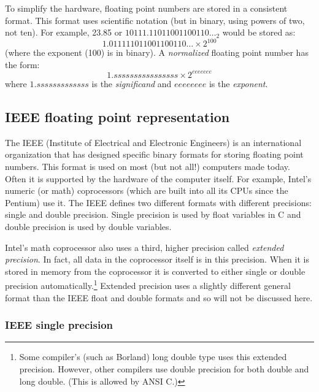 To simplify the hardware, floating point numbers are stored in a consistent
format. This format uses scientific notation (but in binary, using powers of
two, not ten). For example, 23.85 or $10111.11011001100110\ldots_2$ would be
stored as:
\[ 1.011111011001100110\ldots \times 2^{100} \]
(where the exponent (100) is in binary). A \emph{normalized} floating point
number has the form:
\[ 1.ssssssssssssssss \times 2^{eeeeeee} \]
where $1.sssssssssssss$ is the \emph{significand} and $eeeeeeee$ is the
\emph{exponent}.

\subsection{IEEE floating point representation}

The IEEE (Institute of Electrical and Electronic Engineers) is an
international organization that has designed specific binary formats
for storing floating point num\-bers. This format is used on most (but
not all!)  computers made today. Often it is supported by the hardware
of the computer itself. For example, Intel's numeric (or math)
coprocessors (which are built into all its CPUs since the Pentium)
use it. The IEEE defines two different formats with different
precisions: single and double precision. Single precision is used by
{\code float} variables in C and double precision is used by {\code
double} variables.

Intel's math coprocessor also uses a third, higher precision called
\emph{extended precision}. In fact, all data in the coprocessor itself is
in this precision. When it is stored in memory from the coprocessor it
is converted to either single or double precision automatically.\footnote{
Some compiler's (such as Borland) {\code long double} type uses this
extended precision. However, other compilers use double precision for
both {\code double} and {\code long double}. (This is allowed by ANSI C.)}
Extended precision uses a slightly different general format than the
IEEE float and double formats and so will not be discussed here.

\subsubsection{IEEE single precision}

